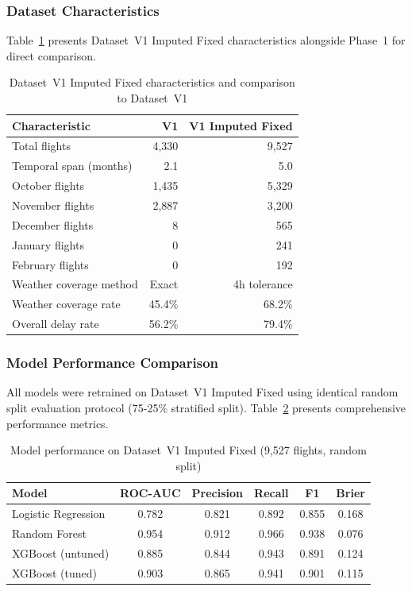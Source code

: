 \documentclass{report}
\begin{document}
\subsubsection*{Dataset Characteristics}

Table~\ref{tab:v2char} presents Dataset~V1 Imputed Fixed characteristics
alongside Phase~1 for direct comparison.

\begin{table}[H]
\centering
\caption{Dataset~V1 Imputed Fixed characteristics and comparison to
  Dataset~V1}
\label{tab:v2char}
\begin{tabular}{lrr}
\toprule
\textbf{Characteristic} & \textbf{V1} & \textbf{V1 Imputed Fixed} \\
\midrule
Total flights              & 4,330  & 9,527  \\
Temporal span (months)     & 2.1    & 5.0    \\
October flights            & 1,435  & 5,329  \\
November flights           & 2,887  & 3,200  \\
December flights           & 8      & 565    \\
January flights            & 0      & 241    \\
February flights           & 0      & 192    \\
Weather coverage method    & Exact  & 4h tolerance \\
Weather coverage rate      & 45.4\% & 68.2\% \\
Overall delay rate         & 56.2\% & 79.4\% \\
\bottomrule
\end{tabular}
\end{table}

\subsubsection*{Model Performance Comparison}

All models were retrained on Dataset~V1 Imputed Fixed using identical random
split evaluation protocol (75-25\% stratified split).
Table~\ref{tab:v2perf} presents comprehensive performance metrics.

\begin{table}[H]
\centering
\caption{Model performance on Dataset~V1 Imputed Fixed (9,527 flights,
  random split)}
\label{tab:v2perf}
\begin{tabular}{lccccc}
\toprule
\textbf{Model} & \textbf{ROC-AUC} & \textbf{Precision} &
  \textbf{Recall} & \textbf{F1} & \textbf{Brier} \\
\midrule
Logistic Regression & 0.782 & 0.821 & 0.892 & 0.855 & 0.168 \\
Random Forest       & 0.954 & 0.912 & 0.966 & 0.938 & 0.076 \\
XGBoost (untuned)   & 0.885 & 0.844 & 0.943 & 0.891 & 0.124 \\
XGBoost (tuned)     & 0.903 & 0.865 & 0.941 & 0.901 & 0.115 \\
\bottomrule
\end{tabular}
\end{table}
\end{document}
